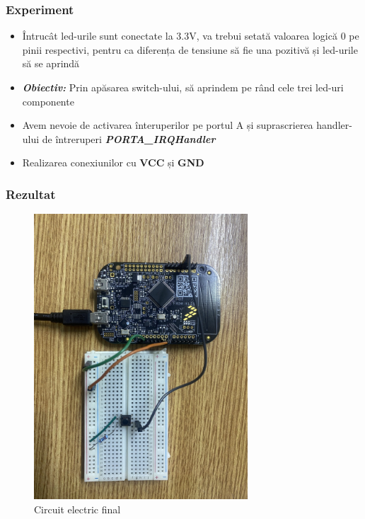 \documentclass[xcolor={table}]{beamer}
\begin{document}
	\begin{frame}
	    \frametitle{Experiment}
	    \begin{itemize}
	        \item Întrucât led-urile sunt conectate la 3.3V, va trebui setată valoarea logică 0 pe pinii respectivi, pentru ca diferența de tensiune să fie una pozitivă și led-urile să se aprindă
	        \item \textbf{\textit{Obiectiv: }} Prin apăsarea switch-ului, să aprindem pe rând cele trei led-uri componente
	        \item Avem nevoie de activarea înteruperilor pe portul A și suprascrierea handler-ului de întreruperi \textbf{\textit{PORTA\_IRQHandler}}
	        \item Realizarea conexiunilor cu \textbf{VCC} și \textbf{GND}
	    \end{itemize}
	\end{frame}
		\begin{frame}
	    \frametitle{Rezultat}
	    \begin{figure}
	        \centering
	        \includegraphics[width=8cm]{images/Ansamblu.jpg}
	        \caption{Circuit electric final}
	        \label{fig:my_label}
	    \end{figure}
	\end{frame}
	\appendix
\end{document}
